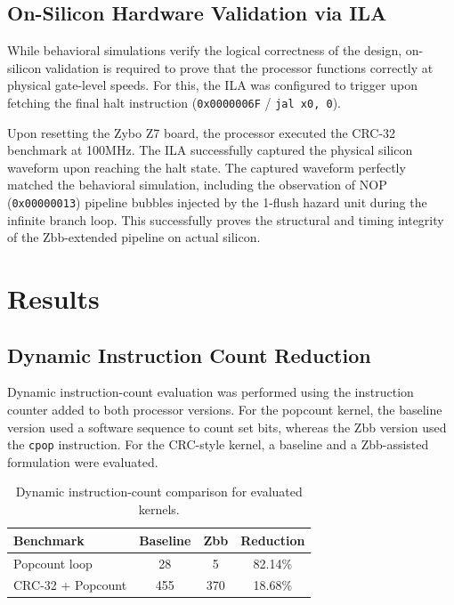 \documentclass[conference]{IEEEtran}
\begin{document}
	\subsection{On-Silicon Hardware Validation via ILA}
	While behavioral simulations verify the logical correctness of the design, on-silicon validation is required to prove that the processor functions correctly at physical gate-level speeds. For this, the ILA was configured to trigger upon fetching the final halt instruction (\texttt{0x0000006F} / \texttt{jal x0, 0}). 

	Upon resetting the Zybo Z7 board, the processor executed the CRC-32 benchmark at 100MHz. The ILA successfully captured the physical silicon waveform upon reaching the halt state. The captured waveform perfectly matched the behavioral simulation, including the observation of NOP (\texttt{0x00000013}) pipeline bubbles injected by the 1-flush hazard unit during the infinite branch loop. This successfully proves the structural and timing integrity of the Zbb-extended pipeline on actual silicon.
	
	\section{Results}
	
	\subsection{Dynamic Instruction Count Reduction}
	Dynamic instruction-count evaluation was performed using the instruction counter added to both processor versions. For the popcount kernel, the baseline version used a software sequence to count set bits, whereas the Zbb version used the \texttt{cpop} instruction. For the CRC-style kernel, a baseline and a Zbb-assisted formulation were evaluated.
	
	\begin{table}[H]
		\centering
		\caption{Dynamic instruction-count comparison for evaluated kernels.}
		\label{tab:inst_count}
		\begin{tabular}{lccc}
			\toprule
			\textbf{Benchmark} & \textbf{Baseline} & \textbf{Zbb} & \textbf{Reduction} \\
			\midrule
			Popcount loop    & 28  & 5   & 82.14\% \\
			CRC-32 + Popcount & 455 & 370 & 18.68\% \\
			\bottomrule
		\end{tabular}
	\end{table}
	
\end{document}
